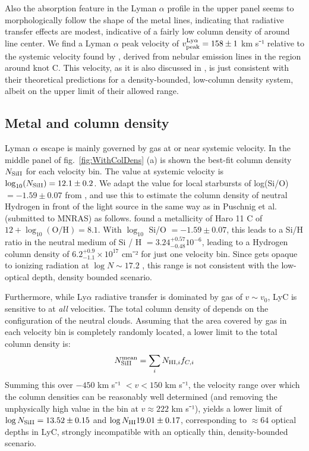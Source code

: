 \documentclass[twocolumn,]{aastex61}
\begin{document}
Also the absorption feature in the Lyman $\alpha$ profile in the upper
panel seems to morphologically follow the shape of the metal lines,
indicating that radiative transfer effects are modest, indicative of a
fairly low column density of  around line center. We find a
Lyman $\alpha$ peak velocity of
$v_{\rm peak}^{\mathrm{Ly}\alpha} = 158 \pm 1$ km s⁻¹ relative to the 
systemic velocity found by \citet{Sandberg2013}, derived from nebular emission
lines in the region around knot C. This velocity, as it is also
discussed in \citet{Verhamme2015}, is just consistent with their
theoretical predictions for a density-bounded, low-column density
system, albeit on the upper limit of their allowed range.

\subsection{Metal and  column
density}\label{metal-and-column-density}

Lyman $\alpha$ escape is mainly governed by gas at or near systemic
velocity. In the middle panel of fig.~\ref{fig:WithColDens} (a) is shown
the best-fit column density $N_{\rm Si II}$ for each velocity bin. The
value at systemic velocity is $\log_{10}(N_{\rm Si II}) = 12.1 \pm 0.2$.
We adapt the value for local starbursts of log(Si/O) $= -1.59 \pm 0.07$
from \citet{Garnett1995}, and use this to estimate the column density of
neutral Hydrogen in front of the light source in the same way as in
Puschnig et al. (submitted to MNRAS) as follows. \citet{Guseva2012}
found a metallicity of Haro 11 C of $12 + \log_{10}(\text{O/H}) = 8.1$.
With $\log_{10}$ Si/O $= -1.59 \pm 0.07$, this leads to a Si/H ratio in
the neutral medium of Si / H $= 3.24^{+0.57}_{-0.48} 10^{-6}$, leading
to a Hydrogen column density of $6.2^{+0.9}_{-1.1} \times 10^{17}$ cm⁻²
for just one velocity bin. Since  gets opaque to ionizing radiation at
$\log N \sim 17.2$ \citep{Verhamme2015}, this range is not consistent
with the low- optical depth, density bounded scenario.

Furthermore, while Ly$\alpha$ radiative transfer is dominated by gas of
$v \sim v_0$, LyC is sensitive to  at \emph{all}
velocities. The total column density of  depends on the
configuration of the neutral clouds. Assuming that the area covered by
gas in each velocity bin is completely randomly located, a lower limit
to the total column density is:
%
\begin{equation}
\label{NHImean}
N_{\rm Si II}^{\rm mean} = \sum_i N_{\text{HI}, i} f_{C, i}
\end{equation}
%
Summing this over $-450$ km s⁻¹ $< v < 150$ km s⁻¹, the velocity range
over which the column densities can be reasonably well determined (and
removing the unphysically high value in the bin at $v \approx 222$ km
s⁻¹), yields a lower limit of $\log N_{\rm Si II} = 13.52 \pm 0.15$ and
$\log N_{\rm H I} 19.01 \pm 0.17$, corresponding to $\approx 64$ optical
depths in LyC, strongly incompatible with an optically thin,
density-bounded scenario.
\end{document}
